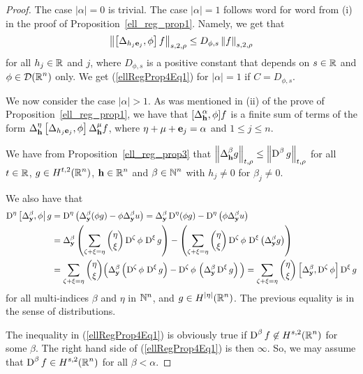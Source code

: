 \begin{proof}
The case $|\alpha|=0$ is trivial.
The case $|\alpha|=1$ follows word for word from (i) in the proof of
Proposition~\ref{ell_reg_prop1}.  Namely, we get that
\[
\left\| \left[ \Delta_{h_j\mathbf{e}_j} ,\phi \right] f \right\|_{s,2,\rho}
\leq D_{\phi,s} \left\| f \right\|_{s,2,\rho}
\]
for all $h_j \in \mathbb{R}$ and $j$, where $D_{\phi,s}$ is a positive constant that
depends on $s\in \mathbb{R}$ and $\displaystyle \phi \in \mathcal{D}(\mathbb{R}^n)$ only.  We get
(\ref{ellRegProp4Eq1}) for $|\alpha|=1$ if $C=D_{\phi,s}$.

We now consider the case $|\alpha|>1$.  As was mentioned
in (ii) of the prove of Proposition~\ref{ell_reg_prop1}, we have that
$\displaystyle [\Delta^\alpha_{\mathbf{h}}, \phi] f$
is a finite sum of terms of the form
$\displaystyle \Delta^{\eta}_{\mathbf{h}} \left[
\Delta_{h_j \mathbf{e}_j}, \phi\right] \Delta^{\mu}_{\mathbf{h}} f$,
where $\eta+\mu+\mathbf{e}_j = \alpha$ and $1\leq j \leq n$.

We have from Proposition~\ref{ell_reg_prop3} that
$\displaystyle \left\| \Delta^{\beta}_{\mathbf{h}} g \right\|_{t,\rho}
\leq \left\| \operatorname{D}^{\beta} g \right\|_{t,\rho}$
for all $t\in \mathbb{R}$, $\displaystyle g \in H^{t,2}(\mathbb{R}^n)$,
$\displaystyle \mathbf{h} \in \mathbb{R}^n$ and $\displaystyle \beta \in \mathbb{N}^n$
with $h_j \neq 0$ for $\beta_j \neq 0$.

We also have that
\begin{align*}
\operatorname{D}^\eta\left[ \Delta^\beta_{\mathbf{y}}, \phi\right| g
&= \operatorname{D}^\eta \left( \Delta^\beta_{\mathbf{y}} (\phi g) - \phi
\Delta^\beta_{\mathbf{y}} u \right)
= \Delta^\beta_{\mathbf{y}} \operatorname{D}^\eta(\phi g) - \operatorname{D}^\eta \left(\phi
\Delta^\beta_{\mathbf{y}} u \right) \\
&= \Delta^\beta_{\mathbf{y}} \left(\sum_{\zeta+\xi = \eta}
\binom{\eta}{\xi} \operatorname{D}^\zeta \phi \, \operatorname{D}^\xi g \right)
- \left(\sum_{\zeta+\xi = \eta}
\binom{\eta}{\xi} \operatorname{D}^\zeta \phi \,
\operatorname{D}^\xi \left( \Delta^\beta_{\mathbf{y}} g \right) \right) \\
&= \sum_{\zeta+\xi = \eta} \binom{\eta}{\xi} \Big(
\Delta^\beta_{\mathbf{y}} \left( \operatorname{D}^\zeta \phi \, \operatorname{D}^\xi g \right)
- \operatorname{D}^\zeta \phi \, \left( \Delta^\beta_{\mathbf{y}} \operatorname{D}^\xi g \right) \Big)
= \sum_{\zeta+\xi = \eta} \binom{\eta}{\xi}
\left[ \Delta^\beta_{\mathbf{y}} , \operatorname{D}^\zeta \phi \right] \operatorname{D}^\xi g
\end{align*}
for all multi-indices $\beta$ and $\eta$ in $\mathbb{N}^n$,
and $\displaystyle g \in H^{|\eta|}(\mathbb{R}^n)$. The previous
equality is in the sense of distributions.

The inequality in (\ref{ellRegProp4Eq1}) is obviously true if
$\displaystyle \operatorname{D}^\beta f \not\in H^{s,2}(\mathbb{R}^n)$ for some $\beta$.
The right hand side of (\ref{ellRegProp4Eq1}) is then $\infty$.  So, we may
assume that $\displaystyle \operatorname{D}^\beta f \in H^{s,2}(\mathbb{R}^n)$ for all
$\beta < \alpha$.


\end{proof}
